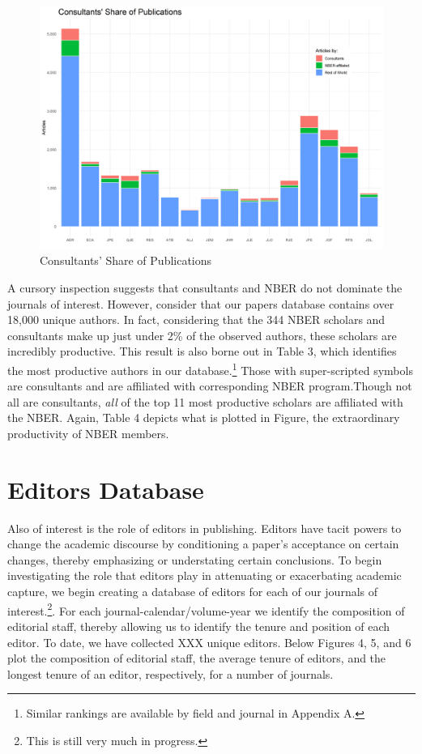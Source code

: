 \documentclass[11pt, letterpaper, twoside]{article}
\begin{document}
\begin{figure}[h]
    \centering    
    \includegraphics[width=\textwidth]{figures/consultants_nber_journal_share.png}
    \caption{Consultants' Share of Publications}
\end{figure}

A cursory inspection suggests that consultants and NBER do not dominate the journals of interest. However, consider that our papers database contains over 18,000 unique authors. In fact, considering that the 344 NBER scholars and consultants make up just under 2\% of the observed authors, these scholars are incredibly productive. This result is also borne out in Table 3, which identifies the most productive authors in our database.\footnote{Similar rankings are available by field and journal in Appendix A.} Those with super-scripted symbols are consultants and are affiliated with corresponding NBER program.Though not all are consultants, \textit{all} of the top 11 most productive scholars are affiliated with the NBER. Again, Table 4 depicts what is plotted in Figure, the extraordinary productivity of NBER members.\\







\section{Editors Database}
Also of interest is the role of editors in publishing. Editors have tacit powers to change the academic discourse by conditioning a paper's acceptance on certain changes, thereby emphasizing or understating certain conclusions. To begin investigating the role that editors play in attenuating or exacerbating academic capture, we begin creating a database of editors for each of our journals of interest.\footnote{This is still very much in progress.}. For each journal-calendar/volume-year we identify the composition of editorial staff, thereby allowing us to identify the tenure and position of each editor. To date, we have collected XXX unique editors. Below Figures 4, 5, and 6 plot the composition of editorial staff, the average tenure of editors, and the longest tenure of an editor, respectively, for a number of journals.\\
\end{document}
